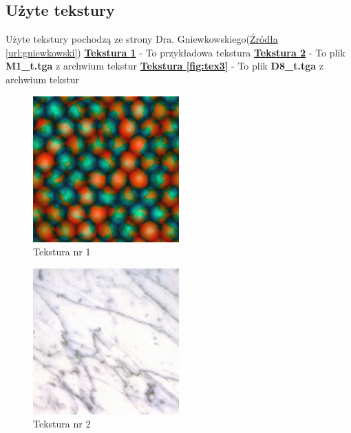 \documentclass{article}
\begin{document}
        \subsection{Użyte tekstury}
        \raggedright
            Użyte tekstury pochodzą ze strony Dra. Gniewkowskiego(\hyperref[url:gniewkowski]{Źródła \ref{url:gniewkowski}})\linebreak
            \hyperref[fig:tex1]{\textbf{Tekstura \ref{fig:tex1}}} - To przykładowa tekstura\linebreak
            \hyperref[fig:tex2]{\textbf{Tekstura \ref{fig:tex2}}} - To plik \textbf{M1\_t.tga} z archwium tekstur\linebreak
            \hyperref[fig:tex3]{\textbf{Tekstura \ref{fig:tex3}}} - To plik \textbf{D8\_t.tga} z archwium tekstur\linebreak
            \begin{figure}[ht]
                \centering
                \includegraphics[width=0.5\textwidth]{images/tekstura1.png}
                \caption{Tekstura nr 1}
                \label{fig:tex1}
            \end{figure}
            \FloatBarrier
            \begin{figure}[ht]
                \centering
                \includegraphics[width=0.5\textwidth]{images/tekstura2.png}
                \caption{Tekstura nr 2}
                \label{fig:tex2}
            \end{figure}
\end{document}
